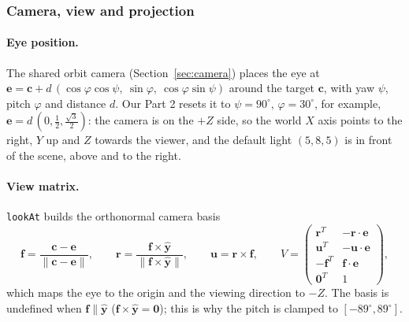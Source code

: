 \documentclass[a4paper, 11pt]{article}
\newcommand{\code}[1]{\texttt{#1}}
\begin{document}
\subsubsection{Camera, view and projection}\label{sec:camera2}

\paragraph{Eye position.} The shared orbit camera (Section~\ref{sec:camera}) places the eye at
$\mathbf e=\mathbf c+d\,(\cos\varphi\cos\psi,\ \sin\varphi,\ \cos\varphi\sin\psi)$ around the target $\mathbf c$, with yaw $\psi$, pitch $\varphi$
and distance $d$. Our Part 2 resets it to $\psi=90^\circ$, $\varphi=30^\circ$, for example, \ $\mathbf e=d\,(0,\tfrac12,\tfrac{\sqrt3}{2})$: the camera is on
the $+Z$ side, so the world $X$ axis points to the right, $Y$ up and $Z$ towards the viewer, and the default light $(5,8,5)$ is in front
of the scene, above and to the right.

\paragraph{View matrix.} \code{lookAt} builds the orthonormal camera basis
\[
  \mathbf f=\frac{\mathbf c-\mathbf e}{\|\mathbf c-\mathbf e\|},\qquad
  \mathbf r=\frac{\mathbf f\times\hat{\mathbf y}}{\|\mathbf f\times\hat{\mathbf y}\|},\qquad
  \mathbf u=\mathbf r\times\mathbf f,
  \qquad
  V=\begin{pmatrix}
    \mathbf r^{T} & -\mathbf r\cdot\mathbf e\\
    \mathbf u^{T} & -\mathbf u\cdot\mathbf e\\
    -\mathbf f^{T} & \mathbf f\cdot\mathbf e\\
    \mathbf 0^{T} & 1
  \end{pmatrix},
\]
which maps the eye to the origin and the viewing direction to $-Z$. The basis is undefined when $\mathbf f\parallel\hat{\mathbf y}$
($\mathbf f\times\hat{\mathbf y}=\mathbf 0$); this is why the pitch is clamped to $[-89^\circ,89^\circ]$.
\end{document}
